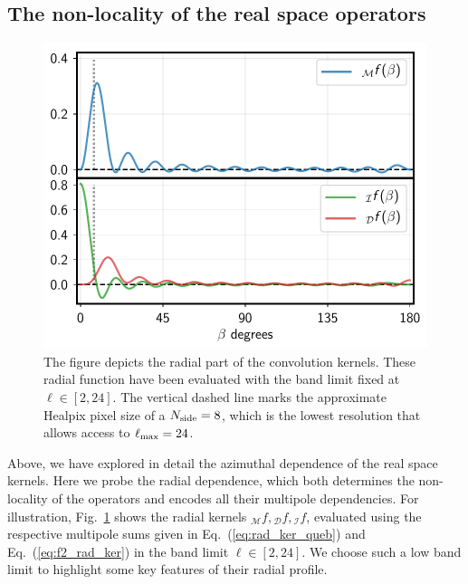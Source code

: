 \documentclass[a4paper,11pt]{article}
\newcommand{\mm}{\mathcal{M}}
\newcommand{\md}{\mathcal{D}}
\newcommand{\mi}{\mathcal{I}}
\def\eq#1{{Eq.~(\ref{#1})}}
\def\fig#1{{Fig.~\ref{#1}}}
\begin{document}
\subsection{The non-locality of the real space operators} \label{sec:radial_locality}
%
\begin{figure}[t]
\centering
\includegraphics[width=0.8\columnwidth]{beta_kernel.pdf}
\caption{The figure depicts the radial part of the convolution kernels. These radial function have been evaluated with the band limit fixed at $\ell \in [2,24]$. The vertical dashed line marks the approximate Healpix pixel size of a $N_{\rm side}=8$, which is the lowest resolution that allows access to $\ell_{\rm max}=24$.}
\label{fig:beta_kernel}
\end{figure}
%
Above, we have explored in detail the  azimuthal dependence of the real space kernels.  Here we probe the radial dependence, which both  determines the non-locality of the operators and encodes all their multipole dependencies. For illustration, \fig{fig:beta_kernel} shows the radial kernels ${_{\mm}f}, {_{\md}f},{_{\mi}f}$, evaluated using the respective multipole sums given in \eq{eq:rad_ker_queb} and \eq{eq:f2_rad_ker} in the band limit $\ell \in [2,24]$. We choose such a low band limit to highlight some key features of their radial profile.
%
\end{document}
